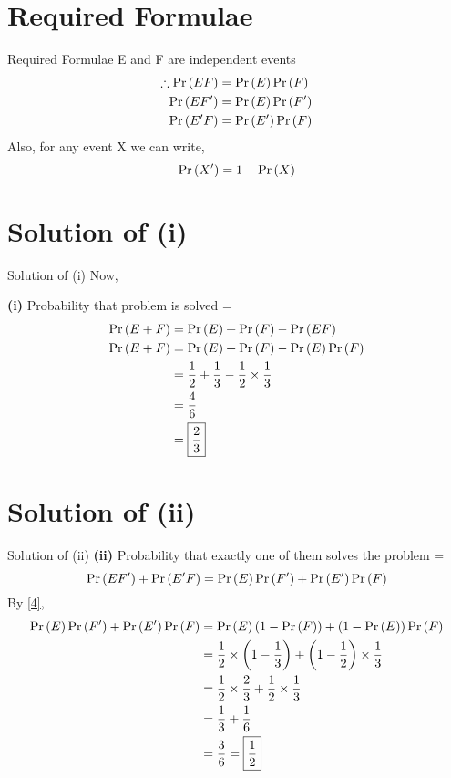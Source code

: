 \documentclass{beamer}
\begin{document}
\section{Required Formulae}

\begin{frame}{Required Formulae}
E and F are independent events
\begin{align}
    \therefore \Pr\left(EF\right) &= \Pr\left(E\right)\Pr\left(F\right) \\
               \Pr\left(EF'\right) &= \Pr\left(E\right)\Pr\left(F'\right) \\
               \Pr\left(E'F\right) &= \Pr\left(E'\right)\Pr\left(F\right) 
\end{align}
Also, for any event X we can write,
\begin{equation}
    \Pr\left(X'\right) = 1 - \Pr\left(X\right) \label{4}
\end{equation}
\end{frame}

\section{Solution of (i)}

\begin{frame}{Solution of (i)}
Now,
        
        \textbf{(i)} Probability that problem is solved = 
        \begin{align}
           \Pr\left(E + F\right) &= \Pr\left(E\right) + \Pr\left(F\right) - \Pr\left(EF\right) \\
            \Pr\left(E+F\right) &= \Pr\left(E\right) + \Pr\left(F\right) - \Pr\left(E\right)\Pr\left(F\right)\\
            &= \frac{1}{2} + \frac{1}{3} - \frac{1}{2}\times\frac{1}{3}\\
            &= \frac{4}{6} \\
            &= \boxed{\frac{2}{3}}
          \end{align}
\end{frame}

\section{Solution of (ii)}

\begin{frame}{Solution of (ii)}
 \textbf{(ii)} Probability that exactly one of them solves the problem =
     \begin{equation}
      \Pr\left(EF'\right) + \Pr\left(E'F\right)  = \Pr\left(E\right)\Pr\left(F'\right) + \Pr\left(E'\right)\Pr\left(F\right)
    \end{equation}
    By \eqref{4},
    \begin{align}
     \Pr\left(E\right)\Pr\left(F'\right) + \Pr\left(E'\right)\Pr\left(F\right)   &= \Pr\left(E\right)\left(1-\Pr\left(F\right)\right) + \left(1-\Pr\left(E\right)\right)\Pr\left(F\right) \\
        &= \frac{1}{2}\times\left(1-\frac{1}{3}\right) +\left(1-\frac{1}{2}\right)\times \frac{1}{3} \\
        &= \frac{1}{2}\times\frac{2}{3} + \frac{1}{2}\times\frac{1}{3} \\
        &= \frac{1}{3} + \frac{1}{6} \\
        &= \frac{3}{6} = \boxed{\frac{1}{2}}
    \end{align}
    

\end{frame}
\end{document}
